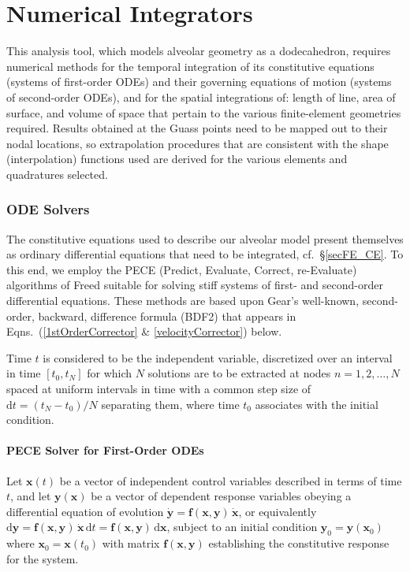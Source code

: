 \part{Numerical Integrators}
\label{partNumericalMethods}

This analysis tool, which models alveolar geometry as a dodecahedron, requires numerical methods for the temporal integration of its constitutive equations (systems of first-order ODEs) and their governing equations of motion (systems of second-order ODEs), and for the spatial integrations of: length of line, area of surface, and volume of space that pertain to the various finite-element geometries required.  Results obtained at the Guass points need to be mapped out to their nodal locations, so extrapolation procedures that are consistent with the shape (interpolation) functions used are derived for the various elements and quadratures selected.

\section{ODE Solvers}

The constitutive equations used to describe our alveolar model present themselves as ordinary differential equations that need to be integrated, cf.\ \S\ref{secFE_CE}.  To this end, we employ the PECE (Predict, Evaluate, Correct, re-Evaluate) algorithms of Freed \cite{Freed17a} suitable for solving stiff systems of first- and second-order differential equations.  These methods are based upon Gear's well-known, second-order, backward, difference formula (BDF2) that appears in Eqns.~(\ref{1stOrderCorrector} \& \ref{velocityCorrector}) below.

Time $t$ is considered to be the independent variable, discretized over an interval in time $[t_0, t_N]$ for which $N$ solutions are to be extracted at nodes $n=1, 2, \ldots, N$ spaced at uniform intervals in time with a common step size of $\mathrm{d}t = (t_N - t_0)/N$ separating them, where time $t_0$ associates with the initial condition.

\subsection{PECE Solver for First-Order ODEs}
\label{sec:1stOrderPECE}

Let $\mathbf{x}(t)$ be a vector of independent control variables described in terms of time $t$, and let $\mathbf{y} (\mathbf{x})$ be a vector of dependent response variables obeying a differential equation of evolution $\dot{\mathbf{y}} = \mathbf{f} (\mathbf{x}, \mathbf{y}) \, \dot{\mathbf{x}}$, or equivalently $\mathrm{d} \mathbf{y} = \mathbf{f} (\mathbf{x}, \mathbf{y}) \, \dot{\mathbf{x}} \, \mathrm{d} t = \mathbf{f} (\mathbf{x}, \mathbf{y}) \, \mathrm{d}\mathbf{x}$, subject to an initial condition $\mathbf{y}_0 = \mathbf{y}(\mathbf{x}_0)$ where $\mathbf{x}_0 = \mathbf{x} (t_0)$ with matrix $\mathbf{f} (\mathbf{x}, \mathbf{y})$ establishing the constitutive response for the system.

